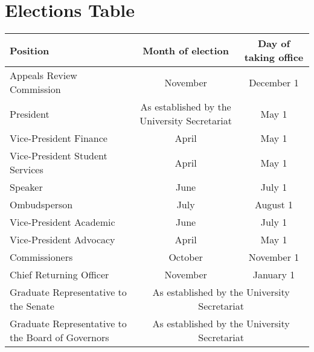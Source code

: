\section{Elections Table}

\begin{center}
    \begin{tabular}{ l |c   c }

    Position & Month of election & Day of taking office \\  \hline
    Appeals Review Commission & November & December 1\\ 
    President & As established by the University Secretariat & May 1\\
    Vice-President Finance  & April & May 1 \\ 
    Vice-President Student Services & April & May 1 \\ 
    Speaker & June & July 1 \\ 
    Ombudsperson & July & August 1\\
    Vice-President Academic & June & July 1 \\ 
    Vice-President Advocacy & April & May 1 \\ 
    Commissioners & October & November  1 \\ 
    Chief Returning Officer & November & January 1 \\ 
    Graduate Representative to the Senate &\multicolumn{2}{c}{As established by the University Secretariat}\\
	Graduate Representative to the Board of Governors  &\multicolumn{2}{c}{As established by the University Secretariat}\\	
\end{tabular}
\end{center}


\newpage
